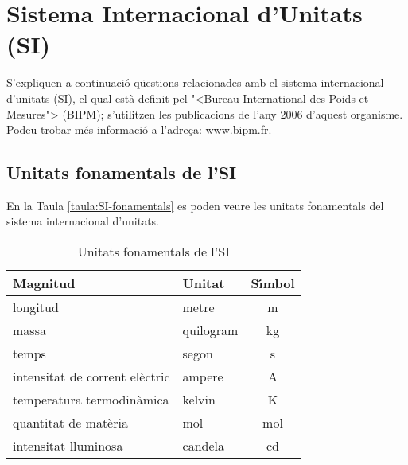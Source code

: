 \chapter{Sistema Internacional d'Unitats (SI)} 

S'expliquen a continuaci\'{o} q\"{u}estions relacionades amb el sistema
internacional d'unitats (SI), el qual est\`{a} definit pel {"<}Bureau
International des Poids et Mesures{">} (\textsf{BIPM}); s'utilitzen les publicacions de l'any 2006 d'aquest organisme. Podeu trobar
m\'{e}s informaci\'{o} a l'adre\c{c}a: \href{http://www.bipm.fr/}{www.bipm.fr}.

\section{Unitats fonamentals de l'SI}

En la Taula \vref{taula:SI-fonamentals} es poden veure les unitats
fonamentals del sistema internacional d'unitats.

\begin{table}[h]
   \caption{\label{taula:SI-fonamentals} Unitats fonamentals de l'SI}
   \begin{center}\begin{tabular}{llc}
   \toprule[1pt]
   Magnitud & Unitat & S\'{\i}mbol \\
   \midrule
   longitud & metre & m \\
   massa & quilogram & kg \\
   temps & segon & s\\
   intensitat de corrent el\`{e}ctric & ampere & A \\
   temperatura termodin\`{a}mica & kelvin & K\\
   quantitat de mat\`{e}ria & mol & mol \\
   intensitat lluminosa & candela &  cd \\
   \bottomrule[1pt]
   \end{tabular} \end{center}
\end{table}
   
   
  
 
   
  

